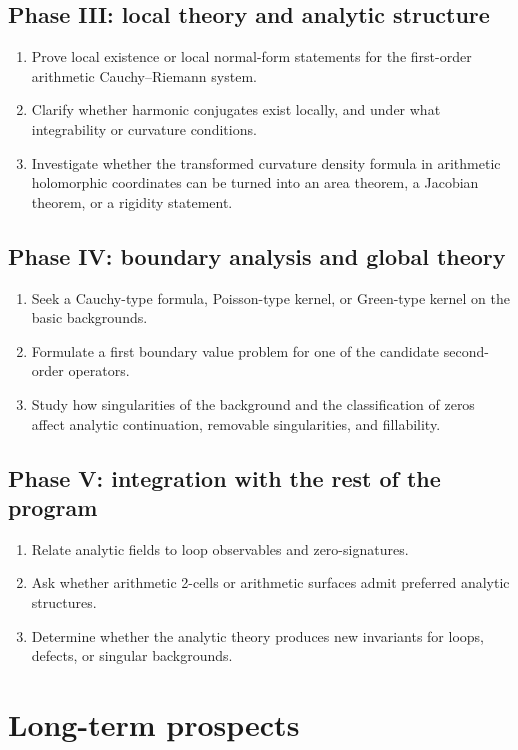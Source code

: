 \documentclass[11pt]{article}
\begin{document}
\subsection*{Phase III: local theory and analytic structure}
\begin{enumerate}[label=III.\arabic*.]
\item Prove local existence or local normal-form statements for the first-order arithmetic Cauchy--Riemann system.
\item Clarify whether harmonic conjugates exist locally, and under what integrability or curvature conditions.
\item Investigate whether the transformed curvature density formula in arithmetic holomorphic coordinates can be turned into an area theorem, a Jacobian theorem, or a rigidity statement.
\end{enumerate}

\subsection*{Phase IV: boundary analysis and global theory}
\begin{enumerate}[label=IV.\arabic*.]
\item Seek a Cauchy-type formula, Poisson-type kernel, or Green-type kernel on the basic backgrounds.
\item Formulate a first boundary value problem for one of the candidate second-order operators.
\item Study how singularities of the background and the classification of zeros affect analytic continuation, removable singularities, and fillability.
\end{enumerate}

\subsection*{Phase V: integration with the rest of the program}
\begin{enumerate}[label=V.\arabic*.]
\item Relate analytic fields to loop observables and zero-signatures.
\item Ask whether arithmetic 2-cells or arithmetic surfaces admit preferred analytic structures.
\item Determine whether the analytic theory produces new invariants for loops, defects, or singular backgrounds.
\end{enumerate}

\section{Long-term prospects}
\end{document}
